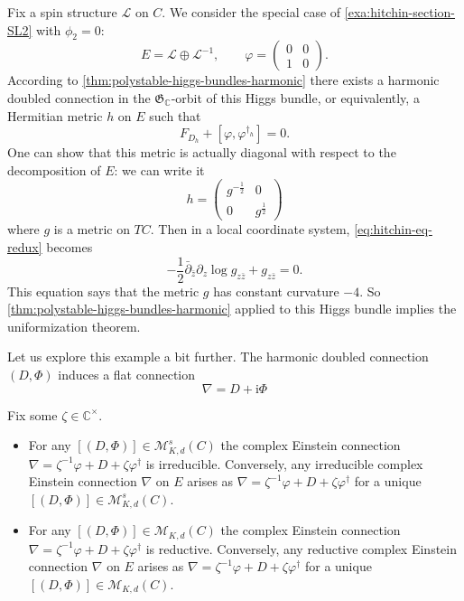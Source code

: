 \documentclass[12pt,letterpaper,reqno]{article}
\numberwithin{equation}{section}
\newcommand{\fG}{{\mathfrak G}}
\newcommand{\cL}{\ensuremath{\mathcal L}}
\newcommand{\cM}{\ensuremath{\mathcal M}}
\newcommand{\C}{\ensuremath{\mathbb C}}
\newcommand{\half}{\ensuremath{\frac{1}{2}}}
\newcommand{\I}{{\mathrm i}}
\newcommand{\fixme}[1]{{\color{orange}{[#1]}}}
\begin{document}
\begin{example} Fix a spin
structure $\cL$ on $C$. We consider the special case of
\autoref{exa:hitchin-section-SL2} with $\phi_2 = 0$:
\begin{equation}
  E = \cL \oplus \cL^{-1}, \qquad \varphi = \begin{pmatrix} 0 & 0 \\ 1 &0 \end{pmatrix}.
\end{equation}
According to \autoref{thm:polystable-higgs-bundles-harmonic}
there exists a harmonic doubled connection in the $\fG_\C$-orbit of this
Higgs bundle, or equivalently, a Hermitian metric $h$ on $E$ such that
\begin{equation} \label{eq:hitchin-eq-redux}
  F_{D_h} + [\varphi, \varphi^{\dagger_h}] = 0.
\end{equation}
One can show \fixme{...} that
this metric is actually diagonal with respect to the decomposition of $E$:
we can write it
\begin{equation}
  h = \begin{pmatrix} g^{-\half} & 0 \\ 0 & g^\half \end{pmatrix}
\end{equation}
where $g$ is a metric on $TC$. Then in a local coordinate system,
\eqref{eq:hitchin-eq-redux} becomes
\begin{equation}
  -\half \bar\partial_{\bar z} \partial_z \log g_{z \bar{z}} + g_{z \bar{z}} = 0.
\end{equation}
This equation says that the metric $g$ has constant curvature
$-4$. So \autoref{thm:polystable-higgs-bundles-harmonic} applied to this
Higgs bundle implies the uniformization theorem.

Let us explore this example a bit further. The harmonic doubled connection
$(D,\Phi)$ induces a flat connection
\begin{equation}
  \nabla = D + \I \Phi
\end{equation}
\fixme{...}

\end{example}


\begin{thm} \label{thm:reductive-connection-harmonic}
Fix some $\zeta \in \C^\times$.
\begin{itemize}
\item For any $[(D,\Phi)] \in \cM^s_{K,d}(C)$ the complex Einstein
connection $\nabla = \zeta^{-1} \varphi + D + \zeta \varphi^\dagger$
is irreducible.
Conversely, any irreducible complex Einstein connection
$\nabla$ on $E$ arises
as $\nabla = \zeta^{-1} \varphi + D + \zeta \varphi^\dagger$
for a unique $[(D,\Phi)] \in \cM^s_{K,d}(C)$.
\item For any $[(D,\Phi)] \in \cM_{K,d}(C)$ the complex Einstein
connection $\nabla = \zeta^{-1} \varphi + D + \zeta \varphi^\dagger$
is reductive.
Conversely, any reductive complex Einstein connection
$\nabla$ on $E$ arises
as $\nabla = \zeta^{-1} \varphi + D + \zeta \varphi^\dagger$
for a unique $[(D,\Phi)] \in \cM_{K,d}(C)$.
\end{itemize}
\end{thm}
\end{document}
